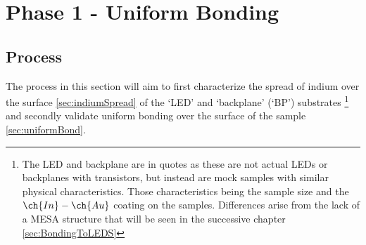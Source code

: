 \chapter{Phase 1 - Uniform Bonding}

\section{Process}
The process in this section will aim to first characterize the spread of indium over the surface \ref{sec:indiumSpread} of the `LED' and `backplane' (`BP') substrates
\footnote{The LED and backplane are in quotes as these are not actual LEDs or backplanes with transistors, but instead are mock samples with similar physical characteristics.
Those characteristics being the sample size and the $\ch{In}-\ch{Au}$ coating on the samples.
Differences arise from the lack of a MESA structure that will be seen in the successive chapter
\ref{sec:BondingToLEDS}}
and secondly validate uniform bonding over the surface of the sample \ref{sec:uniformBond}.

